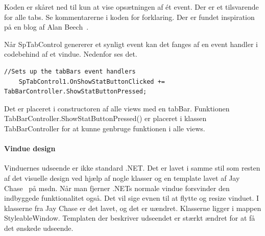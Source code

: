 Koden er skåret ned til kun at vise opsætningen af ét event. Der er et tilsvarende for alle tabs. Se kommentarerne i koden for forklaring.
Der er fundet inspiration på en blog af Alan Beech~\cite{alanbeech2011}.

Når SpTabControl genererer et synligt event kan det fanges af en event handler i codebehind af et vindue. Nedenfor ses det.
\begin{lstlisting}[caption=EventHandler setup, label=EventHandlerSetup]
	//Sets up the tabBars event handlers
	SpTabControl1.OnShowStatButtonClicked += TabBarController.ShowStatButtonPressed;
\end{lstlisting}
Det er placeret i constructoren af alle views med en tabBar.
Funktionen TabBarController.ShowStatButtonPressed() er placeret i klassen TabBarController for at kunne genbruge funktionen i alle views.

\paragraph{Vindue design}
Vinduernes udseende er ikke standard .NET. Det er lavet i samme stil som resten af det visuelle design ved hjælp af nogle klasser og en template lavet af Jay Chase~\cite{websiteCustomWindow} på msdn.
Når man fjerner .NETs normale vindue forsvinder den indbyggede funktionalitet også. Det vil sige evnen til at flytte og resize vinduet. I klasserne fra Jay Chase er det lavet, og det er uændret. Klasserne ligger i mappen StyleableWindow. Templaten der beskriver udseendet er stærkt ændret for at få det ønskede udseende.